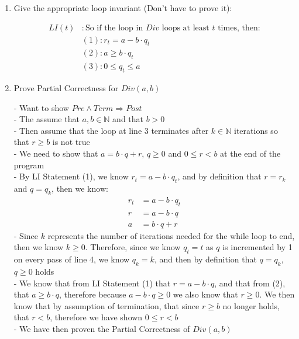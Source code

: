 \documentclass[20pt]{article}
\begin{document}
\begin{enumerate}[label=(\alph*),leftmargin=0cm]
    \item 
    \begin{text}
        Give the appropriate loop invariant (Don't have to prove it):
    \end{text}
    \begin{align}
        LI(t)&: \text{So if the loop in $Div$ loops at least $t$ times, then:}\nonumber\\
        &(1): r_t = a - b \cdot q_t\nonumber\\
        &(2): a \geq b \cdot q_t\nonumber\\
        &(3): 0 \leq q_t \leq a\nonumber
    \end{align}
    
    \item
    \begin{text}
        Prove Partial Correctness for $Div(a,b)$
    \end{text}
    
    \begin{text}
        - Want to show $Pre \land Term \Rightarrow Post$\\
        - The assume that $a, b \in \mathbb{N}$ and that $b > 0$\\
        - Then assume that the loop at line 3 terminates after $k \in \mathbb{N}$ iterations so that $r \geq b$ is not true\\
        - We need to show that $a = b \cdot q + r$, $q \geq 0$ and $0 \leq r < b$ at the end of the program\\
        - By LI Statement (1), we know $r_t = a - b \cdot q_t$, and by definition that $r = r_k$ and $q = q_k$, then we know:
        \begin{align}
            r_t &= a - b \cdot q_t \nonumber\\
            r &= a - b \cdot q \nonumber\tag{By definition}\\
            a &= b \cdot q + r\nonumber\tag{We have solved the first Post-condition requirement}
        \end{align}
        - Since $k$ represents the number of iterations needed for the while loop to end, then we know $k \geq 0$. Therefore, since we know $q_t = t$ as $q$ is incremented by 1 on every pass of line 4, we know $q_k = k$, and then by definition that $q = q_k$, $q \geq 0$ holds\\
        - We know that from LI Statement (1) that $r = a - b \cdot q$, and that from (2), that $a \geq b \cdot q$, therefore because $a - b \cdot q \geq 0$ we also know that $r \geq 0$. We then know that by assumption of termination, that since $r \geq b$ no longer holds, that $r < b$, therefore we have shown $0 \leq r < b$\\
        - We have then proven the Partial Correctness of $Div(a,b)$ \hfill \blacksquare
    \end{text}
    

\end{enumerate}
\end{document}
